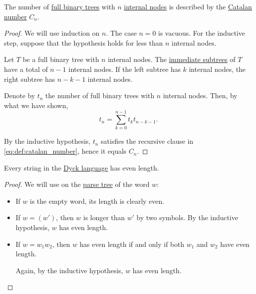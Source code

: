 \begin{proposition}\label{thm:full_binary_tree_count}
  The number of \hyperref[def:n_ary_tree]{full binary trees} with \( n \) \hyperref[def:rooted_tree/internal]{internal nodes} is described by the \hyperref[def:catalan_number]{Catalan number} \( C_n \).
\end{proposition}
\begin{proof}
  We will use induction on \( n \). The case \( n = 0 \) is vacuous. For the inductive step, suppose that the hypothesis holds for less than \( n \) internal nodes.

  Let \( T \) be a full binary tree with \( n \) internal nodes. The \hyperref[def:rooted_tree/subtree]{immediate subtrees} of \( T \) have a total of \( n - 1 \) internal nodes. If the left subtree has \( k \) internal nodes, the right subtree has \( n - k - 1 \) internal nodes.

  Denote by \( t_n \) the number of full binary trees with \( n \) internal nodes. Then, by what we have shown,
  \begin{equation*}
    t_n = \sum_{k=0}^{n-1} t_k t_{n-k-1}.
  \end{equation*}

  By the inductive hypothesis, \( t_n \) satisfies the recursive clause in \eqref{eq:def:catalan_number}, hence it equals \( C_n \).
\end{proof}

\begin{lemma}\label{thm:dyck_language_length}
  Every string in the \hyperref[def:dyck_language]{Dyck language} has even length.
\end{lemma}
\begin{proof}
  We will use  on the \hyperref[def:parse_tree]{parse tree} of the word \( w \):
  \begin{itemize}
    \item If \( w \) is the empty word, its length is clearly even.

    \item If \( w = (w') \), then \( w \) is longer than \( w' \) by two symbols. By the inductive hypothesis, \( w \) has even length.

    \item If \( w = w_1 w_2 \), then \( w \) has even length if and only if both \( w_1 \) and \( w_2 \) have even length.

    Again, by the inductive hypothesis, \( w \) has even length.
  \end{itemize}
\end{proof}

